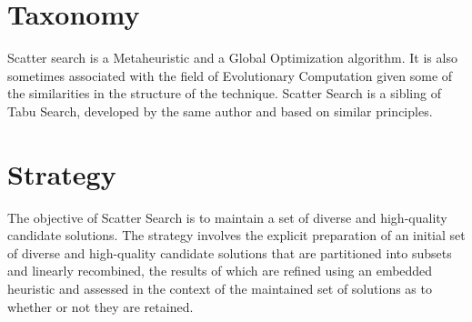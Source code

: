\documentclass[a4paper, 11pt]{article}
\begin{document}
\section{Taxonomy}
\label{sec:taxonomy}
Scatter search is a Metaheuristic and a Global Optimization algorithm. It is also sometimes associated with the field of Evolutionary Computation given some of the similarities in the structure of the technique.
Scatter Search is a sibling of Tabu Search, developed by the same author and based on similar principles.

\section{Strategy}
\label{sec:strategy}
The objective of Scatter Search is to maintain a set of diverse and high-quality candidate solutions.
The strategy involves the explicit preparation of an initial set of diverse and high-quality candidate solutions that are partitioned into subsets and linearly recombined, the results of which are refined using an embedded heuristic and assessed in the context of the maintained set of solutions as to whether or not they are retained. 

\end{document}
